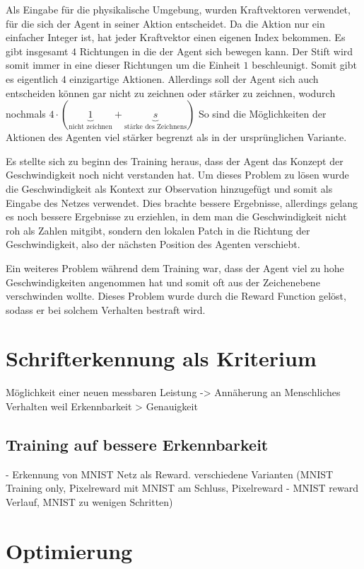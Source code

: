 Als Eingabe für die physikalische Umgebung, wurden Kraftvektoren verwendet, für
die sich der Agent in seiner Aktion entscheidet. Da die Aktion nur ein einfacher
Integer ist, hat jeder Kraftvektor einen eigenen Index bekommen. Es gibt
insgesamt $4$ Richtungen in die der Agent sich bewegen kann. Der Stift wird
somit immer in eine dieser Richtungen um die Einheit $1$ beschleunigt. Somit
gibt es eigentlich $4$ einzigartige Aktionen. Allerdings soll der Agent sich
auch entscheiden können gar nicht zu zeichnen oder stärker zu zeichnen, wodurch
nochmals $4\cdot(\underbrace{1}_{\text{nicht zeichnen}} +
\underbrace{s}_{\text{stärke des Zeichnens}})$ So sind die Möglichkeiten der
Aktionen des Agenten viel stärker begrenzt als in der ursprünglichen Variante.

Es stellte sich zu beginn des Training heraus, dass der Agent das Konzept der
Geschwindigkeit noch nicht verstanden hat. Um dieses Problem zu lösen wurde die
Geschwindigkeit als Kontext zur Observation hinzugefügt und somit als Eingabe
des Netzes verwendet. Dies brachte bessere Ergebnisse, allerdings gelang es noch
bessere Ergebnisse zu erziehlen, in dem man die Geschwindigkeit nicht roh als
Zahlen mitgibt, sondern den lokalen Patch in die Richtung der Geschwindigkeit,
also der nächsten Position des Agenten verschiebt.

Ein weiteres Problem während dem Training war, dass der Agent viel zu hohe
Geschwindigkeiten angenommen hat und somit oft aus der Zeichenebene verschwinden
wollte. Dieses Problem wurde durch die Reward Function gelöst, sodass er bei
solchem Verhalten bestraft wird.



\section{Schrifterkennung als Kriterium}
Möglichkeit einer neuen messbaren Leistung
-> Annäherung an Menschliches Verhalten weil Erkennbarkeit > Genauigkeit


\subsection*{Training auf bessere Erkennbarkeit}
- Erkennung von MNIST Netz als Reward. 
verschiedene Varianten (MNIST Training only, Pixelreward mit MNIST am Schluss, Pixelreward - MNIST reward Verlauf, MNIST zu wenigen Schritten)


\section{Optimierung}
